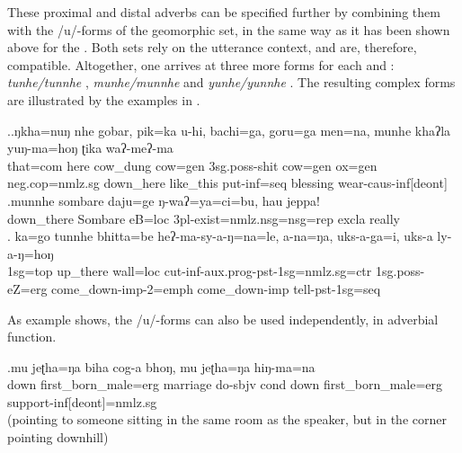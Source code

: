These proximal and distal adverbs can be specified further by combining them with the /u/-forms of the geomorphic set, in the same way as it has been shown above for the . Both sets rely on the utterance context, and are, therefore, compatible. Altogether, one arrives at three more forms for each   and : \emph{tunhe/tunnhe} , \emph{munhe/munnhe}  and \emph{yunhe/yunnhe} . The resulting complex forms are illustrated by the examples in \Next. 

\ex.\ag.\label{tikamunhe}ŋkha=nuŋ   nhe  gobar,   pik=ka    u-hi,    bachi=ga,        goru=ga    men=na,    munhe     khaʔla   yuŋ-ma=hoŋ      ʈika    waʔ-meʔ-ma  \\
that{\sc =com} here cow\_dung cow{\sc =gen} {\sc 3sg.poss-}shit cow{\sc =gen} ox{\sc =gen} {\sc neg.cop=nmlz.sg} down\_here like\_this put{\sc -inf=seq} blessing wear{\sc -caus-inf[deont]}\\
 
\bg.munnhe     sombare  daju=ge            ŋ-waʔ=ya=ci=bu,                      hau   jeppa!\\
down\_there Sombare eB{\sc =loc} {\sc 3pl-}exist{\sc =nmlz.nsg=nsg=rep} {\sc excla} really\\
 
\bg. ka=go      tunnhe   bhitta=be    heʔ-ma-sy-a-ŋ=na=le,   a-na=ŋa,     uks-a-ga=i,       uks-a ly-a-ŋ=hoŋ\\
{\sc 1sg=top} up\_there wall{\sc =loc} cut{\sc -inf-aux.prog-pst-1sg=nmlz.sg=ctr} {\sc 1sg.poss-}eZ{\sc =erg} come\_down{\sc -imp-2=emph} come\_down{\sc -imp} tell{\sc -pst-1sg=seq}\\
 

As example \Next shows, the /u/-forms can also be used independently, in adverbial function. 

\exg.mu     jeʈha=ŋa   biha     cog-a             bhoŋ, mu     jeʈha=ŋa            hiŋ-ma=na\\
down first\_born\_male{\sc =erg} marriage do{\sc [3sg]-sbjv} {\sc cond} down first\_born\_male{\sc =erg} support{\sc -inf[deont]=nmlz.sg}\\
 (pointing to someone sitting in the same room as the speaker, but in the corner pointing downhill) 


